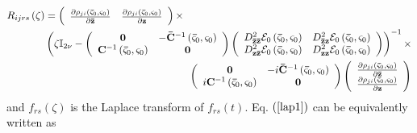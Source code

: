 \documentclass[aps,preprint]{revtex4}%
\begin{document}
\begin{align}
R_{ijrs}\left(  \zeta\right)   &  =\left(
\begin{array}
[c]{cc}%
\frac{\partial\rho_{ji}\left(  \mathbf{\bar{\varsigma}}_{0},\mathbf{\varsigma
}_{0}\right)  }{\partial\mathbf{\bar{z}}} & \frac{\partial\rho_{ji}\left(
\mathbf{\bar{\varsigma}}_{0},\mathbf{\varsigma}_{0}\right)  }{\partial
\mathbf{z}}%
\end{array}
\right)  \times\nonumber\\
&  \left(  \zeta\mathbb{I}_{2\nu}-\left(
\begin{array}
[c]{cc}%
\mathbf{0} & -\mathbf{\bar{C}}^{-1}\left(  \mathbf{\bar{\varsigma}}%
_{0},\mathbf{\varsigma}_{0}\right) \\
\mathbf{C}^{-1}\left(  \mathbf{\bar{\varsigma}}_{0},\mathbf{\varsigma}%
_{0}\right)  & \mathbf{0}%
\end{array}
\right)  \left(
\begin{array}
[c]{cc}%
D_{\mathbf{\bar{z}\bar{z}}}^{2}\mathcal{E}_{0}\left(  \mathbf{\bar{\varsigma}%
}_{0},\mathbf{\varsigma}_{0}\right)  & D_{\mathbf{\bar{z}z}}^{2}%
\mathcal{E}_{0}\left(  \mathbf{\bar{\varsigma}}_{0},\mathbf{\varsigma}%
_{0}\right) \\
D_{\mathbf{z\bar{z}}}^{2}\mathcal{E}_{0}\left(  \mathbf{\bar{\varsigma}}%
_{0},\mathbf{\varsigma}_{0}\right)  & D_{\mathbf{zz}}^{2}\mathcal{E}%
_{0}\left(  \mathbf{\bar{\varsigma}}_{0},\mathbf{\varsigma}_{0}\right)
\end{array}
\right)  \right)  ^{-1}\times\nonumber\\
&  \qquad\qquad\qquad\qquad\qquad\qquad\qquad\left(
\begin{array}
[c]{cc}%
\mathbf{0} & -i\mathbf{\bar{C}}^{-1}\left(  \mathbf{\bar{\varsigma}}%
_{0},\mathbf{\varsigma}_{0}\right) \\
i\mathbf{C}^{-1}\left(  \mathbf{\bar{\varsigma}}_{0},\mathbf{\varsigma}%
_{0}\right)  & \mathbf{0}%
\end{array}
\right)  \left(
\begin{array}
[c]{c}%
\frac{\partial\rho_{ji}\left(  \mathbf{\bar{\varsigma}}_{0},\mathbf{\varsigma
}_{0}\right)  }{\partial\mathbf{\bar{z}}}\\
\frac{\partial\rho_{ji}\left(  \mathbf{\bar{\varsigma}}_{0},\mathbf{\varsigma
}_{0}\right)  }{\partial\mathbf{z}}%
\end{array}
\right)  \label{lap1}%
\end{align}
and $f_{rs}\left(  \zeta\right)  $ is the Laplace transform of $f_{rs}\left(
t\right)  .$ Eq. $\left(  \ref{lap1}\right)  $ can be equivalently written as
\end{document}
